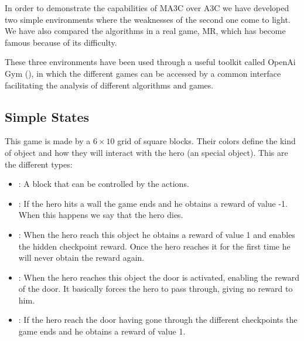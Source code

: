 In order to demonstrate the capabilities of \ac{MA3C} over \ac{A3C} we have developed two simple environments where the
weaknesses of the second one come to light.
We have also compared the algorithms in a real game, \acl{MR}, which has become famous because of its difficulty.

These three environments have been used through a useful toolkit called OpenAi Gym (\cite{gym}), in which the different games
can be accessed by a common interface facilitating the analysis of different algorithms and games.


\subsection{Simple States\label{subsec:SimpleStates}}

This game is made by a $6 \times 10$ grid of square blocks.
Their colors define the kind of object and how they will interact with the hero (an special object).
This are the different types:
\begin{itemize}
  \item {}: A block that can be controlled by the actions.
  \item {}: If the hero hits a wall the game ends and he obtains a reward of value -1.
  When this happens we say that the hero dies.
  \item {}: When the hero reach this object he obtains a reward of value 1 and enables the hidden
  checkpoint reward.
  Once the hero reaches it for the first time he will never obtain the reward again.
  \item {}: When the hero reaches this object the door is activated, enabling the reward of the door.
  It basically forces the hero to pass through, giving no reward to him.
  \item {}: If the hero reach the door having gone through the different checkpoints the game ends and
  he obtains a reward of value 1.
\end{itemize}

